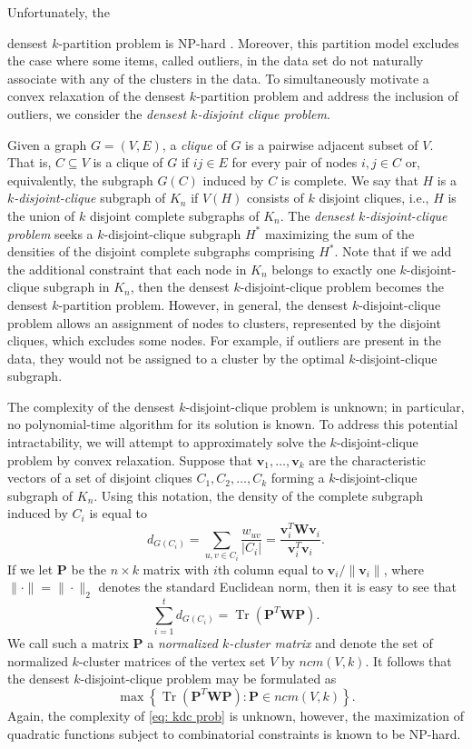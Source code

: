 \documentclass[twoside,11pt]{article}
\DeclareMathOperator{\tr}{{Tr}}
\renewcommand{\P}{\bs{P}}
\newcommand{\bs}{\boldsymbol}
\renewcommand{\v}{\bs{v}}
\newcommand{\W}{\bs {W}}
\newcommand{\0}{\bs{0}}
\newcommand{\bra}[1]{\ensuremath{\left\{ #1 \right\}}} %
\newcommand{\kdc}{\(k\)-disjoint-clique }
\begin{document}
Unfortunately, the {densest \(k\)-partition problem is NP-hard \citep[see][]{peng2007approximating}. Moreover, this partition model excludes the
	case where some items, called outliers, in the data set do not naturally associate
	with any of the clusters in the data.
	To simultaneously motivate a convex relaxation of the densest \(k\)-partition
	problem and address the inclusion of outliers, we consider the \emph{densest
		\(k\)-disjoint clique problem}.

	Given a graph \(G=(V,E)\), a \emph{clique} of \(G\) is a pairwise
	adjacent subset of \(V\). That is, \(C \subseteq V\)
	is a clique of \(G\) if \(ij\in E\) for every pair of nodes \(i,j \in C\)
	or, equivalently, the subgraph \(G(C)\) induced by \(C\) is
	{complete}.
	We say that \(H\) is a \emph{\(k\)-disjoint-clique} subgraph of \(K_n\)
	if \(V(H)\) consists of \(k\) disjoint cliques, i.e., \(H\) is the union
	of \(k\) disjoint complete subgraphs of \(K_n\).
	The \emph{densest \(k\)-disjoint-clique problem} seeks a \(k\)-disjoint-clique
	subgraph \(H^*\) maximizing the sum of the densities of the disjoint
	complete subgraphs comprising \(H^*\).
	Note that if we add the additional constraint that each node in \(K_n\) belongs
	to exactly one \kdc subgraph in \(K_n\), then
	the densest \kdc problem becomes the densest \(k\)-partition problem.
	However, in general, the densest \kdc problem allows an assignment of nodes
	to clusters, represented by the disjoint cliques, which excludes
	some nodes. For example, if outliers are present in the data, they would not be assigned to a
	cluster by the optimal \kdc subgraph.

	The complexity of the densest \kdc problem is unknown;
	in particular, no polynomial-time algorithm for its solution is known.
	To address this potential intractability, we will attempt to approximately solve the \kdc problem by convex
	relaxation.
	Suppose that \( \v_1, \dots, \v_k \) are the characteristic vectors
	of a set of disjoint cliques \(C_1, C_2, \dots, C_k\)
	forming a \kdc subgraph of \(K_n\).
	Using this notation, the density of the complete subgraph induced
	by \(C_i\) is equal to
	\[
	d_{G(C_i)} = \sum_{u, v \in C_{i}} \frac{w_{uv}}{|C_i|}
	= \frac{\v_i^T \W \v_i}{\v_i^T \v_i}.
	\]
	If we let \(\P\) be the \(n \times k\) matrix with \(i\)th column equal to \(\v_i/ \|\v_i\|\), where \(\|\cdot\| = \|\cdot\|_2\)
	denotes the standard Euclidean norm, then
	it is easy to see that
	\[
	\sum_{i=1}^t d_{G(C_i)} = \tr(\P^T \W \P).
	\]
	We call such a matrix \(\P\) a \emph{normalized \(k\)-cluster matrix} and denote the set of normalized \(k\)-cluster
	matrices of the vertex set \(V\) by \(ncm(V,k)\).
	It follows that the densest \kdc problem may be formulated as
	\begin{equation} \label{eq: kdc prob}
	\max \bra{ \tr(\P^T \W \P) : \P \in ncm(V,k) }.
	\end{equation}
	Again, the complexity of \eqref{eq: kdc prob} is unknown, however, the maximization of quadratic functions
	subject to combinatorial constraints is known to be NP-hard.

}
\end{document}
